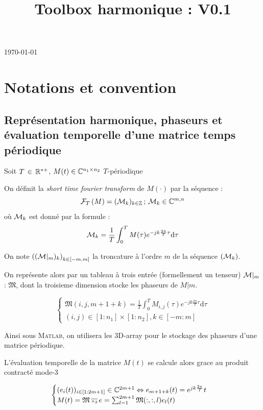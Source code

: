 \documentclass[journal,onecolumn]{IEEEtran}
\begin{document}
\title{Toolbox harmonique : V0.1}
\maketitle
\today 

\section{Notations et convention}

\subsection{Représentation harmonique, phaseurs et évaluation temporelle d'une matrice temps périodique}

Soit $T \, \in \, \mathbb{R}^{*+}$, $ M(t) \in \mathbb{C}^{n_1 \times n_2}$ $T$-périodique

On définit la \emph{short time fourier transform} de $M(\cdot)$ par la séquence :
\begin{equation}
\mathcal{F}_{T} \left( M \right)  = (\mathcal{M}_{k})_{k\in \mathbb{Z}} \, ; \,\mathcal{M}_{k} \in \mathbb{C}^{m,n}
\end{equation}
où $\mathcal{M}_{k}$ est donné par la formule : 
\begin{equation}
\mathcal{M}_{k} = \frac{1}{T} \int_{0}^{T} M(\tau) e^{-j k \frac{2\pi}{T} \tau }\mathrm{d}\tau 
\end{equation}

On note $\left((\mathcal{M} |_{m})_{k}\right)_{k\in [-m,m]}$ la troncature à l'ordre $m$ de la séquence $(\mathcal{M}_{k})$. 


On représente alors par un tableau à trois entrée (formellement un tenseur) $\mathcal{M}|_{m}$ : $\mathfrak{M}$, dont la troisieme dimension stocke les phaseurs de $M|m$.

\begin{equation}
\begin{cases}
\mathfrak{M}(i,j,m+1+k) = \frac{1}{T} \int_{0}^{T} M_{i,j}(\tau) e^{-j k \frac{2\pi}{T} \tau }\mathrm{d}\tau \\ 
(i,j) \in [1:n_1] \times[ 1:n_2], k \in [-m:m]
\end{cases}
\end{equation}

Ainsi sous \textsc{Matlab}, on utilisera les 3D-array pour le stockage des phaseurs d'une matrice périodique. 

L'évaluation temporelle de la matrice $M(t)$ se calcule alors grace au produit contracté mode-3 

\begin{equation}
\begin{cases}
(e_{i}(t))_{i\in [1 : 2m+1]} \in \C^{2m+1} \Leftrightarrow e_{m+1+k}(t) = e^{j k \frac{2 \pi }{T}}t \\
M(t) = \mathfrak{M} \cpmoden3 e =\sum_{l =1}^{2m+1} \mathfrak{M}(:,:,l) e_l(t)
\end{cases}
\end{equation}
\end{document}
